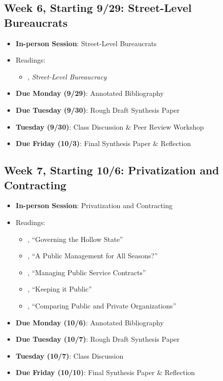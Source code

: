 \documentclass[12pt]{article}     %
\begin{document}
\subsection*{Week 6, Starting 9/29: Street-Level Bureaucrats}
\begin{itemize}
    \item \textbf{In-person Session}: Street-Level Bureaucrats
    \item Readings:
        \begin{itemize}
            \item \citet{Lipsky2010}, \emph{Street-Level Bureaucracy}
        \end{itemize}
    \item \textbf{Due Monday (9/29)}: Annotated Bibliography
    \item \textbf{Due Tuesday (9/30)}: Rough Draft Synthesis Paper
    \item \textbf{Tuesday (9/30)}: Class Discussion \& Peer Review Workshop
    \item \textbf{Due Friday (10/3)}: Final Synthesis Paper \& Reflection
\end{itemize}

\subsection*{Week 7, Starting 10/6: Privatization and Contracting}
\begin{itemize}
    \item \textbf{In-person Session}: Privatization and Contracting
    \item Readings:
        \begin{itemize}
            \item \citet{MILWARD2000a}, ``Governing the Hollow State''
            \item \cite{hood1991}, ``A Public Management for All Seasons?''
            \item \citet{brownManagingPublicService2006}, ``Managing Public Service Contracts''
            \item \citet{jos2009}, ``Keeping it Public''
            \item \citet{RAINEY2000a}, ``Comparing Public and Private Organizations''
        \end{itemize}
    \item \textbf{Due Monday (10/6)}: Annotated Bibliography
    \item \textbf{Due Tuesday (10/7)}: Rough Draft Synthesis Paper
    \item \textbf{Tuesday (10/7)}: Class Discussion
    \item \textbf{Due Friday (10/10)}: Final Synthesis Paper \& Reflection
\end{itemize}
\end{document}
